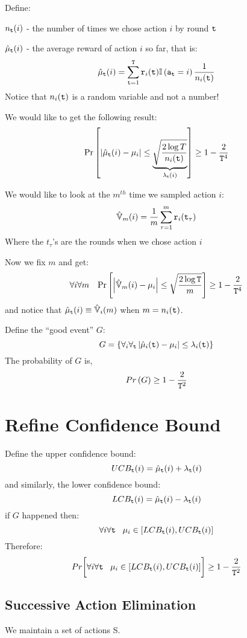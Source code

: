 Define:

$n_{{\tt t}}(i)$ - the number of times we chose action $i$ by round ${\tt t}$

$\hat{\mu}_{{\tt t}}(i)$ - the average reward of action $i$ so far, that
is:
\[
\hat{\mu}_{{\tt t}}(i)={\displaystyle
\sum_{{\tt t}=1}^{{\tt T}}{\tt r}_{i}({\tt t})}\mathbb{I}\left({\tt a}_{{\tt t}}=i\right)\frac{1}{n_{i}({\tt t})}
\]
Notice that $n_{i}({\tt t})$ is a random variable and not a number!

We would like to get the following result:
\[
\Pr\left[\left|\hat{\mu}_{{\tt t}}(i)-\mu_{i}\right|\le\underbrace{\sqrt{\frac{2\log
T}{n_{i}({\tt t})}}}_{\lambda_{{\tt t}}(i)}\right]\ge1-\frac{2}{{\tt T}^{4}}
\]

We would like to look at the $m^{th}$ time we sampled action $i$:
\[
\hat{\mathbb{V}}_{m}(i)=\frac{1}{m} \sum_{\tau=1}^{m}{\tt r}_{i}({\tt t}_{\tau})
\]
Where the $t_{\tau}$'s are the rounds when we chose action $i$

Now we fix $m$ and get:
\[
\forall{i}\forall{m}\;\;\;
\Pr\left[\left|\hat{\mathbb{V}}_{m}(i)-\mu_{i}\right|\le\sqrt{\frac{2\log
{\tt T}}{m}}\right]\ge1-\frac{2}{{\tt T}^{4}}
\]
and notice that $\hat{\mu}_{{\tt t}}(i)\equiv\hat{\mathbb{V}}_{i}(m)$ when
$m=n_{i}({\tt t})$.

Define the ``good event'' $G$:
\[
G=\left\{ \forall_{i}\forall_{{\tt t}}\left|\hat{\mu}_{i}({\tt t})-\mu_{i}\right|\le\lambda_{i}({\tt t})\right\}
\]
The probability of $G$ is,
\[
Pr\left(G\right)\ge1-\frac{2}{{\tt T}^{2}}
\]

\section{Refine Confidence Bound}

Define the upper confidence bound:
\[
UCB_{{\tt t}}(i)=\hat{\mu}_{{\tt t}}(i)+\lambda_{{\tt t}}(i)
\]
and similarly, the lower confidence bound:
\[
LCB_{{\tt t}}(i)=\hat{\mu}_{{\tt t}}(i)-\lambda_{{\tt t}}(i)
\]
if $G$ happened then:
\[
\forall{i}\forall{{\tt t}}\;\;\;\mu_{i}\in\left[LCB_{{\tt t}}(i),UCB_{{\tt t}}(i)\right]
\]
Therefore:
\[
Pr\biggl[\forall{i}\forall{{\tt t}}\;\;\;
\mu_{i}\in\left[LCB_{{\tt t}}(i),UCB_{{\tt t}}(i)\right]\biggr]\ge1-\frac{2}{{\tt T}^{2}}
\]

\subsection{Successive Action Elimination}

We maintain a set of actions S.


